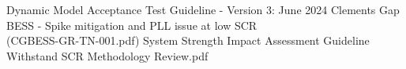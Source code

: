 \renewcommand\bibname{References}

\begin{thebibliography}{99}
	Dynamic Model Acceptance Test Guideline - Version 3: June 2024
	Clements Gap BESS - Spike mitigation and PLL issue at low SCR\\
	(CGBESS-GR-TN-001.pdf)
	System Strength Impact Assessment Guideline Withstand SCR Methodology Review.pdf
\end{thebibliography}